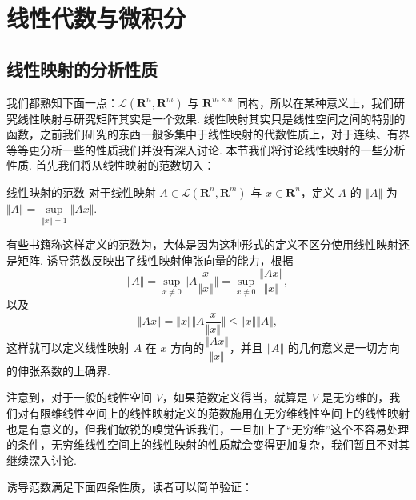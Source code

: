 \chapter{线性代数与微积分}

\section{线性映射的分析性质}


我们都熟知下面一点：$\mathcal{L}(\mathbf{R}^n, \mathbf{R}^m)$ 与 $\mathbf{R}^{m\times n}$ 同构，所以在某种意义上，我们研究线性映射与研究矩阵其实是一个效果. 线性映射其实只是线性空间之间的特别的函数，之前我们研究的东西一般多集中于线性映射的代数性质上，对于连续、有界等等更分析一些的性质我们并没有深入讨论. 本节我们将讨论线性映射的一些分析性质. 首先我们将从线性映射的范数切入：

\begin{definition}{线性映射的范数}{} 
    对于线性映射 $A\in \mathcal{L}(\mathbf{R}^n, \mathbf{R}^m)$ 与 $x\in\mathbf{R}^n$，定义 $A$ 的 $\Vert A \Vert$ 为 $\Vert A \Vert = \sup\limits_{\Vert x\Vert =  1} \Vert Ax\Vert$.
\end{definition}

有些书籍称这样定义的范数为，大体是因为这种形式的定义不区分使用线性映射还是矩阵. 诱导范数反映出了线性映射伸张向量的能力，根据\[\Vert A\Vert = \sup\limits_{x\neq 0}\Vert A\frac{x}{\Vert x\Vert}\Vert = \sup\limits_{x\neq 0}\frac{\Vert Ax\Vert}{\Vert x\Vert},\]以及\[\Vert Ax\Vert = \Vert x\Vert \Vert A\frac{x}{\Vert x\Vert}\Vert \leqslant \Vert x\Vert \Vert A\Vert,\]这样就可以定义线性映射 $A$ 在 $x$ 方向的$\dfrac{\Vert Ax\Vert}{\Vert x\Vert}$，并且 $\Vert A\Vert$ 的几何意义是一切方向的伸张系数的上确界.

注意到，对于一般的线性空间 $V$，如果范数定义得当，就算是 $V$ 是无穷维的，我们对有限维线性空间上的线性映射定义的范数施用在无穷维线性空间上的线性映射也是有意义的，但我们敏锐的嗅觉告诉我们，一旦加上了``无穷维''这个不容易处理的条件，无穷维线性空间上的线性映射的性质就会变得更加复杂，我们暂且不对其继续深入讨论.

诱导范数满足下面四条性质，读者可以简单验证：

